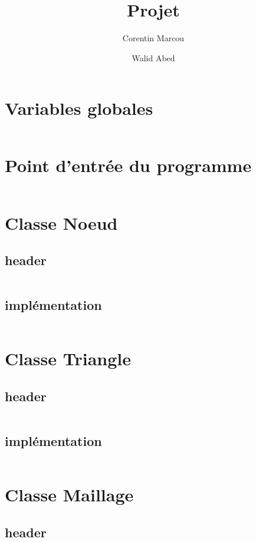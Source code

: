 \documentclass{article}
\title{Projet}
\author{Corentin Marcou \and Walid Abed}
\begin{document}
\maketitle
\tableofcontents

\section{Variables globales}

\inputminted{cpp}{donnees_du_probleme.h}

\section{Point d'entrée du programme}

\inputminted{cpp}{main.cpp}

\section{Classe Noeud}

\subsection{header}
\inputminted{cpp}{noeud.h}

\subsection{implémentation}
\inputminted{cpp}{noeud.cpp}

\section{Classe Triangle}

\subsection{header}
\inputminted{cpp}{triangle.h}

\subsection{implémentation}
\inputminted{cpp}{triangle.cpp}

\section{Classe Maillage}

\subsection{header}
\inputminted{cpp}{maillage.h}
\end{document}
